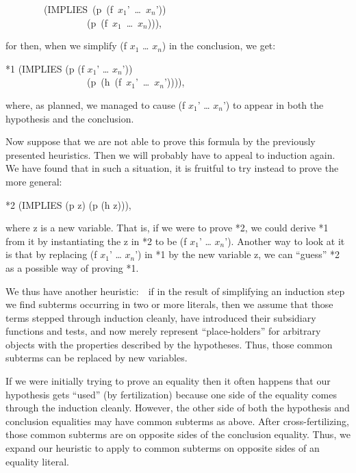 \documentclass[10pt]{book}
\newenvironment{pubasis}{\begin{flushleft}}{\end{flushleft}}
\begin{document}
\begin{pubasis}
~~~~~~~~(IMPLIES~(p~(f~$x_{1}$'~\ldots{}~$x_{n}$'))\\
~~~~~~~~~~~~~~~~~(p~(f~$x_{1}$~\ldots{}~$x_{n}$))),\\
\end{pubasis}
for then, when we simplify (f $x_{1}$ \ldots{} $x_{n}$) in the conclusion, we
get:

\begin{pubasis}
*1	(IMPLIES (p (f $x_{1}$' \ldots{} $x_{n}$'))\\
~~~~~~~~~~~~~~~~~(p~(h~(f~$x_{1}$'~\ldots{}~$x_{n}$')))),\\
\end{pubasis}
where, as planned, we managed to cause (f $x_{1}$' \ldots{} $x_{n}$') to appear in 
both the
hypothesis and the conclusion. 

Now suppose that we are not able to prove this formula
by the previously presented heuristics.  Then we will
probably have to appeal to induction again.  We have found
that in such a situation, it is fruitful to
try instead to prove the more general:
\begin{pubasis}
*2	(IMPLIES (p z) (p (h z))),\\
\end{pubasis}
where z is a new variable.  That is, if we were to prove *2, we could  derive *1 from it
by instantiating the z in *2 to be (f $x_{1}$' \ldots{} $x_{n}$').
Another way to look at it is that by replacing
(f $x_{1}$' \ldots{} $x_{n}$') in *1 by the new variable z,
we can ``guess'' *2 as a possible way
of proving *1.

We thus have  another heuristic:~~if in the result
of simplifying an induction step we find subterms occurring in two or
more literals, then we assume that those terms
stepped through induction cleanly, have introduced their subsidiary
functions and tests, and now merely represent ``place-holders'' for
arbitrary objects with the properties described by the hypotheses.
Thus, those common subterms can be replaced by new variables.

If we were initially trying to prove an equality then it often happens
that our hypothesis gets ``used'' (by fertilization) because one side
of the equality comes through the induction cleanly.  However, the
other side of both the hypothesis and conclusion equalities may
have common subterms as above.  After cross-fertilizing, those common
subterms are on opposite sides of the conclusion equality.
Thus, we expand our heuristic to apply to
common subterms on opposite sides of an equality literal.
\end{document}
